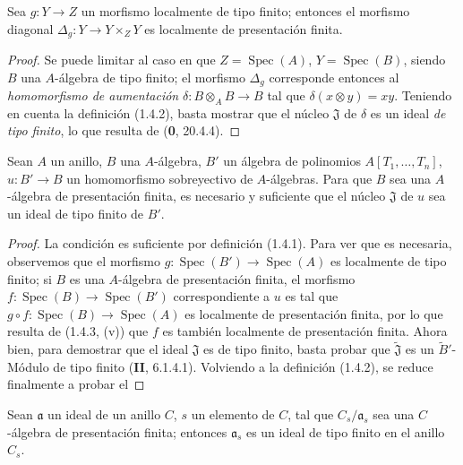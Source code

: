 \begin{corollary}[1.4.3.1]
\label{IV.1.4.3.1-fr}
Sea $g:Y\to Z$ un morfismo localmente de tipo finito; entonces el morfismo
diagonal $\Delta_g:Y\to Y\times_ZY$ es localmente de presentación finita.
\end{corollary}


\begin{proof}
Se puede limitar al caso en que $Z=\operatorname{Spec}(A)$, $Y=\operatorname{Spec}(B)$, siendo $B$ una
$A$-álgebra de tipo finito; el morfismo $\Delta_g$ corresponde entonces al
\emph{homomorfismo de aumentación} $\delta:B\otimes_AB\to B$ tal que
$\delta(x\otimes y)=xy$. Teniendo en cuenta la definición (1.4.2), basta
mostrar que el núcleo $\mathfrak J$ de $\delta$ es un ideal \emph{de tipo
finito}, lo que resulta de (\textbf{0}, 20.4.4).
\end{proof}

\begin{proposition}[1.4.4]
\label{IV.1.4.4-fr}
Sean $A$ un anillo, $B$ una $A$-álgebra, $B'$ un álgebra de polinomios
$A[T_1,\ldots,T_n]$, $u:B'\to B$ un homomorfismo sobreyectivo de
$A$-álgebras. Para que $B$ sea una $A$-álgebra de presentación finita, es necesario
y suficiente que el núcleo $\mathfrak J$ de $u$ sea un ideal de tipo finito de
$B'$.
\end{proposition}

\begin{proof}
La condición es suficiente por definición (1.4.1). Para ver que es
necesaria, observemos que el morfismo $g:\operatorname{Spec}(B')\to\operatorname{Spec}(A)$ es
localmente de tipo finito; si $B$ es una $A$-álgebra de presentación finita,
el morfismo $f:\operatorname{Spec}(B)\to\operatorname{Spec}(B')$ correspondiente a $u$ es tal que
$g\circ f:\operatorname{Spec}(B)\to\operatorname{Spec}(A)$ es localmente de presentación finita, por lo que
resulta de (1.4.3, (v)) que $f$ es también localmente de presentación finita.
Ahora bien, para demostrar que el ideal $\mathfrak J$ es de tipo finito, basta
probar que $\widetilde{\mathfrak J}$ es un $\widetilde{B}'$-Módulo de tipo
finito (\textbf{II}, 6.1.4.1). Volviendo a la definición (1.4.2), se reduce finalmente
a probar el
\end{proof}

\begin{lemma}[1.4.4.1]
\label{IV.1.4.4.1-fr}
Sean $\mathfrak a$ un ideal de un anillo $C$, $s$ un elemento de $C$, tal que
$C_s/\mathfrak a_s$ sea una $C$-álgebra de presentación finita; entonces
$\mathfrak a_s$ es un ideal de tipo finito en el anillo $C_s$.
\end{lemma}


